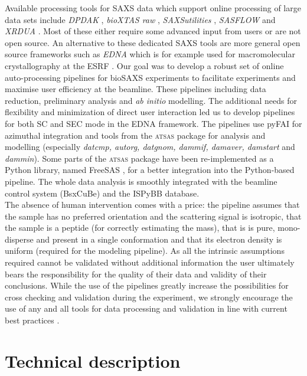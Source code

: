 \documentclass[preprint,pdf]{iucr}              %
\begin{document}
Available processing tools for SAXS data which support online processing of
large data sets include \textit{DPDAK} \cite{DPDAK}, \textit{bioXTAS raw}
\cite{BioXTASraw}, \textit{SAXSutilities} \cite{SAXSUtilities},
\textit{SASFLOW} \cite{X33P,P12} and \textit{XRDUA} \cite{xrdua}. 
Most of these either require some advanced input from users or are not open source.
An alternative to these dedicated SAXS tools are more general open source frameworks such as
\textit{EDNA} which is for example used for macromolecular crystallography at
the ESRF \cite{EDNA}.
Our goal was to develop a robust set of online auto-processing pipelines for 
bioSAXS experiments to facilitate experiments and maximise user efficiency at the 
beamline. 
These pipelines including data reduction, preliminary analysis and 
\textit{ab initio} modelling.
The additional needs for flexibility and minimization of direct user interaction
led us to develop pipelines for both SC and SEC mode in the EDNA framework.
The pipelines use pyFAI for azimuthal integration \cite{pyFAI} and
tools from the \textsc{atsas} package \cite{ATSAS1,ATSAS2} for analysis and modelling
(especially \textit{datcmp, autorg, datgnom, dammif, damaver, damstart} and
\textit{dammin}).
Some parts of the \textsc{atsas} package have been re-implemented as a Python
library, named FreeSAS \cite{freesas}, for a better integration into the
Python-based pipeline.
The whole data analysis is smoothly integrated with the beamline control system
(BsxCuBe) and the ISPyBB \cite{ISPYBB} database.\\

The absence of human intervention comes with a price:  the pipeline assumes that 
the sample has no preferred orientation and the scattering signal is isotropic,  
that the sample is a peptide (for correctly estimating the mass), that is is pure, 
mono-disperse and present in a single conformation and that its  electron density 
is uniform (required for the modeling pipeline). 
As all the intrinsic assumptions required cannot be validated without additional 
information the user ultimately bears the responsibility for the quality of 
their data and validity of their conclusions. 
While the use of the pipelines greatly increase the possibilities for cross 
checking and validation during the experiment, we strongly encourage the use of 
any and all tools for data processing and validation in line with current best 
practices \cite{jacques}. 

\section{Technical description}
\end{document}
